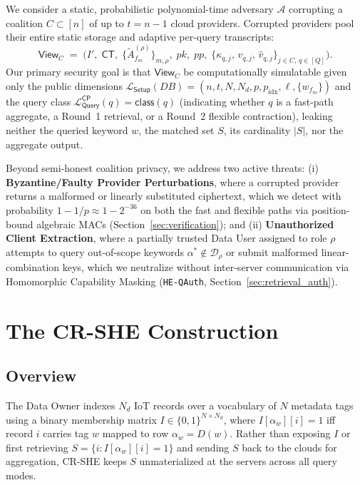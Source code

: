 \documentclass[11pt,a4paper]{article}
\begin{document}
We consider a static, probabilistic polynomial-time adversary $\mathcal{A}$ corrupting a coalition $C \subset [n]$ of up to $t = n - 1$ cloud providers. Corrupted providers pool their entire static storage and adaptive per-query transcripts:
\begin{equation}
    \mathsf{View}_C \;=\; \Big(I',\; \mathsf{CT},\; \{\widetilde{A}_{f_m}^{(\rho)}\}_{m,\rho},\; pk,\; pp,\; \{\kappa_{q,j},\, v_{q,j},\, \hat{v}_{q,j}\}_{j \in C,\, q \in [Q]}\Big).
\end{equation}
Our primary security goal is that $\mathsf{View}_C$ be computationally simulatable given only the public dimensions $\mathcal{L}_{\mathsf{Setup}}(DB) = (n, t, N, N_d, p, p_{\mathrm{idx}}, \ell, \{w_{f_m}\})$ and the query class $\mathcal{L}^{\mathsf{CP}}_{\mathsf{Query}}(q) = \mathsf{class}(q)$ (indicating whether $q$ is a fast-path aggregate, a Round~1 retrieval, or a Round~2 flexible contraction), leaking neither the queried keyword $w$, the matched set $S$, its cardinality $|S|$, nor the aggregate output.

Beyond semi-honest coalition privacy, we address two active threats: (i) \textbf{Byzantine/Faulty Provider Perturbations}, where a corrupted provider returns a malformed or linearly substituted ciphertext, which we detect with probability $1 - 1/p \approx 1 - 2^{-36}$ on both the fast and flexible paths via position-bound algebraic MACs (Section~\ref{sec:verification}); and (ii) \textbf{Unauthorized Client Extraction}, where a partially trusted Data User assigned to role $\rho$ attempts to query out-of-scope keywords $\alpha^* \notin \mathcal{D}_\rho$ or submit malformed linear-combination keys, which we neutralize without inter-server communication via Homomorphic Capability Masking (\texttt{HE-QAuth}, Section~\ref{sec:retrieval_auth}).

\section{The CR-SHE Construction}\label{sec:construction}

\subsection{Overview}
The Data Owner indexes $N_d$ IoT records over a vocabulary of $N$ metadata tags using a binary membership matrix $I \in \{0,1\}^{N \times N_d}$, where $I[\alpha_w][i] = 1$ iff record $i$ carries tag $w$ mapped to row $\alpha_w = D(w)$. Rather than exposing $I$ or first retrieving $S = \{i : I[\alpha_w][i] = 1\}$ and sending $S$ back to the clouds for aggregation, CR-SHE keeps $S$ unmaterialized at the servers across all query modes.
\end{document}
